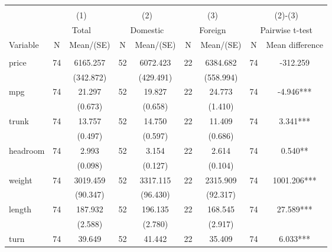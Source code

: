 
\begin{tabular}{@{\extracolsep{5pt}}lcccccccc}
\\[-1.8ex]\hline \hline \\[-1.8ex]
 & \multicolumn{2}{c}{(1)}  & \multicolumn{2}{c}{(2)}  & \multicolumn{2}{c}{(3)}  & \multicolumn{2}{c}{(2)-(3)} \\
 & \multicolumn{2}{c}{Total}  & \multicolumn{2}{c}{Domestic}  & \multicolumn{2}{c}{Foreign}  & \multicolumn{2}{c}{Pairwise t-test}  \\
Variable & N & Mean/(SE) & N & Mean/(SE) & N & Mean/(SE) & N & Mean difference \\ \hline \\[-1.8ex] 
price   & 74    & 6165.257    & 52    & 6072.423    & 22    & 6384.682    & 74    & -312.259   \\
 &   & (342.872)  &   & (429.491)  &   & (558.994)  &   &  \\ [1ex]
mpg   & 74    & 21.297    & 52    & 19.827    & 22    & 24.773    & 74    & -4.946***   \\
 &   & (0.673)  &   & (0.658)  &   & (1.410)  &   &  \\ [1ex]
trunk   & 74    & 13.757    & 52    & 14.750    & 22    & 11.409    & 74    & 3.341***   \\
 &   & (0.497)  &   & (0.597)  &   & (0.686)  &   &  \\ [1ex]
headroom   & 74    & 2.993    & 52    & 3.154    & 22    & 2.614    & 74    & 0.540**   \\
 &   & (0.098)  &   & (0.127)  &   & (0.104)  &   &  \\ [1ex]
weight   & 74    & 3019.459    & 52    & 3317.115    & 22    & 2315.909    & 74    & 1001.206***   \\
 &   & (90.347)  &   & (96.430)  &   & (92.317)  &   &  \\ [1ex]
length   & 74    & 187.932    & 52    & 196.135    & 22    & 168.545    & 74    & 27.589***   \\
 &   & (2.588)  &   & (2.780)  &   & (2.917)  &   &  \\ [1ex]
turn   & 74    & 39.649    & 52    & 41.442    & 22    & 35.409    & 74    & 6.033***   \\

\end{tabular}
